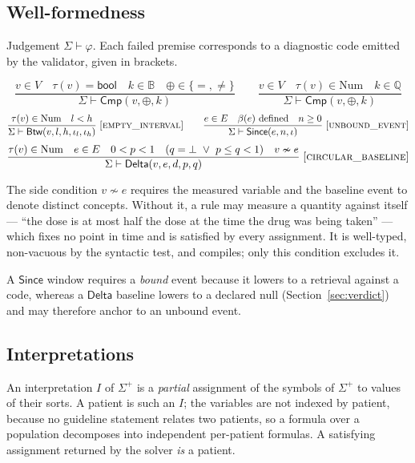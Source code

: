 \subsection{Well-formedness}

Judgement $\Sigma \vdash \varphi$. Each failed premise corresponds to a
diagnostic code emitted by the validator, given in brackets.

\[
\frac{v \in V \quad \tau(v)=\mathsf{bool} \quad k \in \mathbb{B} \quad \oplus \in \{=,\neq\}}
     {\Sigma \vdash \mathsf{Cmp}(v,\oplus,k)}
\qquad
\frac{v \in V \quad \tau(v)\in\mathrm{Num} \quad k \in \mathbb{Q}}
     {\Sigma \vdash \mathsf{Cmp}(v,\oplus,k)}
\]
\smallskip
\[
\frac{\tau(v)\in\mathrm{Num} \quad l<h}
     {\Sigma \vdash \mathsf{Btw}(v,l,h,\iota_l,\iota_h)}
\;\textsc{[empty\_interval]}
\qquad
\frac{e \in E \quad \beta(e)\ \text{defined} \quad n \ge 0}
     {\Sigma \vdash \mathsf{Since}(e,n,\iota)}
\;\textsc{[unbound\_event]}
\]
\smallskip
\[
\frac{\tau(v)\in\mathrm{Num} \quad e \in E \quad 0<p<1 \quad
      (q=\bot \ \vee\ p \le q<1) \quad v \nsim e}
     {\Sigma \vdash \mathsf{Delta}(v,e,d,p,q)}
\;\textsc{[circular\_baseline]}
\]

The side condition $v \nsim e$ requires the measured variable and the baseline
event to denote distinct concepts. Without it, a rule may measure a quantity
against itself --- ``the dose is at most half the dose at the time the drug was
being taken'' --- which fixes no point in time and is satisfied by every
assignment. It is well-typed, non-vacuous by the syntactic test, and compiles;
only this condition excludes it.

A $\mathsf{Since}$ window requires a \emph{bound} event because it lowers to a
retrieval against a code, whereas a $\mathsf{Delta}$ baseline lowers to a
declared null (Section~\ref{sec:verdict}) and may therefore anchor to an unbound
event.

\subsection{Interpretations}

An interpretation $I$ of $\Sigma^{+}$ is a \emph{partial} assignment of the
symbols of $\Sigma^{+}$ to values of their sorts. A patient is such an $I$;
the variables are not indexed by patient, because no guideline statement relates
two patients, so a formula over a population decomposes into independent
per-patient formulas. A satisfying assignment returned by the solver
\emph{is} a patient.

